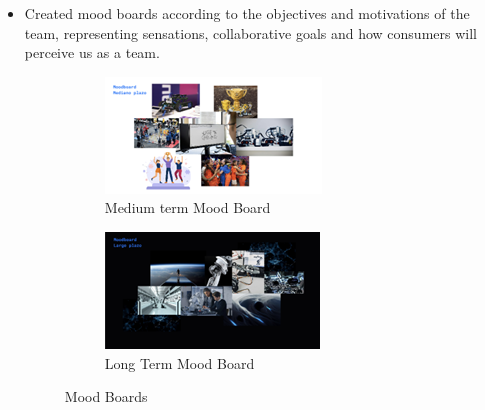\documentclass{article}
\begin{document}
\begin{itemize}
\begin{figure}[H]
    \end{figure}
    \item Created mood boards according to the objectives and motivations of the team, representing sensations, collaborative goals and how consumers will perceive us as a team. 
    \begin{figure}[H]
        \centering
        \begin{subfigure}{.5\textwidth}
          \centering
          \includegraphics[width=.8\linewidth]{Images/Design/Moodboard1.png}
          \caption{Medium term Mood Board}
          
        \end{subfigure}%
        \begin{subfigure}{.5\textwidth}
          \centering
          \includegraphics[width=.8\linewidth]{Images/Design/Moodboard2.png}
          \caption{Long Term Mood Board}
          
        \end{subfigure}
        \caption{Mood Boards}
        
    \end{figure}
\end{itemize}
\end{document}
